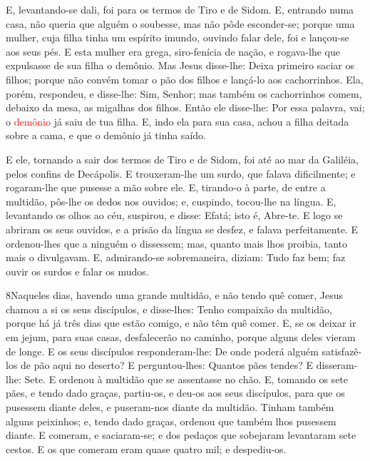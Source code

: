 E, levantando-se dali, foi para os termos de Tiro e de Sidom. E,
entrando numa casa, não queria que alguém o soubesse, mas não pôde
esconder-se; porque uma mulher, cuja filha tinha um espírito
imundo, ouvindo falar dele, foi e lançou-se aos seus pés. E
esta mulher era grega, siro-fenícia de nação, e rogava-lhe que
expulsasse de sua filha o demônio. Mas Jesus disse-lhe: Deixa
primeiro saciar os filhos; porque não convém tomar o pão dos filhos
e lançá-lo aos cachorrinhos. Ela, porém, respondeu, e
disse-lhe: Sim, Senhor; mas também os cachorrinhos comem, debaixo da
mesa, as migalhas dos filhos. Então ele disse-lhe: Por essa
palavra, vai; o \textcolor{red}{demônio} já saiu de tua filha. E,
indo ela para sua casa, achou a filha deitada sobre a cama, e que o
demônio já tinha saído.

E ele, tornando a sair dos termos de Tiro e de Sidom, foi até ao
mar da Galiléia, pelos confins de Decápolis. E trouxeram-lhe
um surdo, que falava dificilmente; e rogaram-lhe que pusesse a mão
sobre ele. E, tirando-o à parte, de entre a multidão, pôs-lhe
os dedos nos ouvidos; e, cuspindo, tocou-lhe na língua. E,
levantando os olhos ao céu, suspirou, e disse: Efatá; isto é,
Abre-te. E logo se abriram os seus ouvidos, e a prisão da
língua se desfez, e falava perfeitamente. E ordenou-lhes que
a ninguém o dissessem; mas, quanto mais lhos proibia, tanto mais o
divulgavam. E, admirando-se sobremaneira, diziam: Tudo faz
bem; faz ouvir os surdos e falar os mudos.

\medskip

\lettrine{8} Naqueles dias, havendo uma grande multidão, e não
tendo quê comer, Jesus chamou a si os seus discípulos, e disse-lhes:
Tenho compaixão da multidão, porque há já três dias que estão
comigo, e não têm quê comer. E, se os deixar ir em jejum, para
suas casas, desfalecerão no caminho, porque alguns deles vieram de
longe. E os seus discípulos responderam-lhe: De onde poderá
alguém satisfazê-los de pão aqui no deserto? E perguntou-lhes:
Quantos pães tendes? E disseram-lhe: Sete. E ordenou à multidão
que se assentasse no chão. E, tomando os sete pães, e tendo dado
graças, partiu-os, e deu-os aos seus discípulos, para que os
pusessem diante deles, e puseram-nos diante da multidão. Tinham
também alguns peixinhos; e, tendo dado graças, ordenou que também
lhos pusessem diante. E comeram, e saciaram-se; e dos pedaços
que sobejaram levantaram sete cestos. E os que comeram eram
quase quatro mil; e despediu-os.

